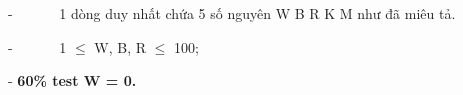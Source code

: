 -       1 dòng duy nhất chứa 5 số nguyên W B R K M như đã miêu tả.  

   -       1  $\le$  W, B, R  $\le$  100;  

   -   \textbf{    60\% test W = 0.   }